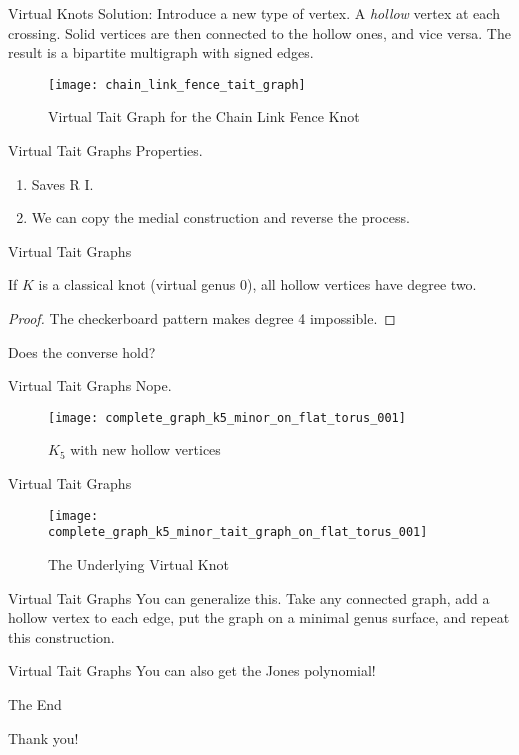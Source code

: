 \documentclass{beamer}
\begin{document}
    \begin{frame}{Virtual Knots}
        Solution: Introduce a new type of vertex. A \textit{hollow} vertex
        at each crossing. Solid vertices are then connected to the hollow ones,
        and vice versa. The result is a bipartite multigraph with signed
        edges.
        \begin{figure}
            \centering
            \texttt{[image: chain\_link\_fence\_tait\_graph]}
            \caption{Virtual Tait Graph for the Chain Link Fence Knot}
        \end{figure}
    \end{frame}
    \begin{frame}{Virtual Tait Graphs}
        Properties.
        \begin{enumerate}
            \item Saves R I.
            \item We can copy the medial construction and reverse the process.
        \end{enumerate}
    \end{frame}
    \begin{frame}{Virtual Tait Graphs}
        \begin{theorem}
            If $K$ is a classical knot (virtual genus 0), all hollow vertices
            have degree two.
        \end{theorem}
        \begin{proof}
            The checkerboard pattern makes degree 4 impossible.
        \end{proof}
        Does the converse hold?
    \end{frame}
    \begin{frame}{Virtual Tait Graphs}
        Nope.
        \begin{figure}
            \centering
            \texttt{[image: complete\_graph\_k5\_minor\_on\_flat\_torus\_001]}
            \caption{$K_{5}$ with new hollow vertices}
        \end{figure}
    \end{frame}
    \begin{frame}{Virtual Tait Graphs}
        \begin{figure}
            \centering
            \texttt{[image: complete\_graph\_k5\_minor\_tait\_graph\_on\_flat\_torus\_001]}
            \caption{The Underlying Virtual Knot}
        \end{figure}
    \end{frame}
    \begin{frame}{Virtual Tait Graphs}
        You can generalize this.
        Take any connected graph, add a hollow vertex to each edge, put the
        graph on a minimal genus surface, and repeat this construction.
    \end{frame}
    \begin{frame}{Virtual Tait Graphs}
        You can also get the Jones polynomial!
    \end{frame}
    \begin{frame}{The End}
        \begin{center}
            Thank you!
        \end{center}
    \end{frame}
\end{document}
